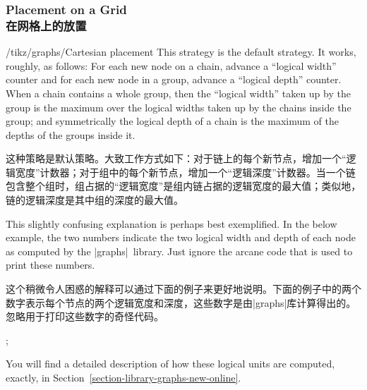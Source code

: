 \subsubsection{Placement on a Grid\\在网格上的放置}

\begin{key}{/tikz/graphs/Cartesian placement}
    This strategy is the default strategy. It works, roughly, as follows: For
    each new node on a chain, advance a ``logical width'' counter and for each
    new node in a group, advance a ``logical depth'' counter. When a chain
    contains a whole group, then the ``logical width'' taken up by the group is
    the maximum over the logical widths taken up by the chains inside the
    group; and symmetrically the logical depth of a chain is the maximum of the
    depths of the groups inside it.

    这种策略是默认策略。大致工作方式如下：对于链上的每个新节点，增加一个“逻辑宽度”计数器；对于组中的每个新节点，增加一个“逻辑深度”计数器。当一个链包含整个组时，组占据的“逻辑宽度”是组内链占据的逻辑宽度的最大值；类似地，链的逻辑深度是其中组的深度的最大值。

    This slightly confusing explanation is perhaps best exemplified. In the
    below example, the two numbers indicate the two logical width and depth of
    each node as computed by the |graphs| library. Just ignore the arcane code
    that is used to print these numbers.

    这个稍微令人困惑的解释可以通过下面的例子来更好地说明。下面的例子中的两个数字表示每个节点的两个逻辑宽度和深度，这些数字是由|graphs|库计算得出的。忽略用于打印这些数字的奇怪代码。

\begin{codeexample}[preamble={\usetikzlibrary{graphs}}]
\tikz
  ;
\end{codeexample}
    You will find a detailed description of how these logical units are
    computed, exactly, in Section~\ref{section-library-graphs-new-online}.


\end{key}
